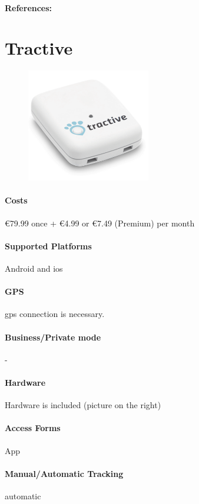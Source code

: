 \paragraph{References:} \cite{Maxtech}
\newpage

\section{Tractive}
\begin{figure}
  \begin{center}
    \includegraphics[width=0.48\textwidth]{bilder/tractive}
  \end{center}
\end{figure}
\paragraph{Costs}\euro 79.99 once + \euro 4.99 or \euro 7.49 (Premium) per month 
\paragraph{Supported Platforms}Android and \gls{ios} 
\paragraph{GPS} \gls{gps} connection is necessary.
\paragraph{Business/Private mode} -
\paragraph{Hardware}Hardware is included (picture on the right)
\paragraph{Access Forms}App
\paragraph{Manual/Automatic Tracking}automatic
